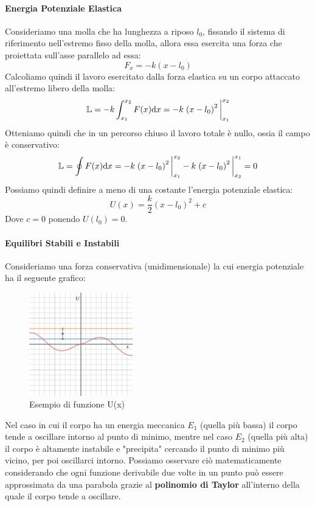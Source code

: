 \documentclass{article}
\begin{document}
\paragraph{Energia Potenziale Elastica}
Consideriamo una molla che ha lunghezza a riposo $l_0$, fissando il sistema di riferimento nell'estremo fisso della molla, allora essa esercita una forza che proiettata sull'asse parallelo ad essa:
\[F_x=-k(x-l_0)\]
Calcoliamo quindi il lavoro esercitato dalla forza elastica su un corpo attaccato all'estremo libero della molla:
\[\mathbb{L}=-k\int_{x_1}^{x_2}F(x)\dd x=-k\eval{\left(x-l_0\right)^2}_{x_1}^{x_2}\]
Otteniamo quindi che in un percorso chiuso il lavoro totale è nullo, ossia il campo è conservativo:
\[\mathbb{L}=\oint F(x)\dd x=-k\eval{\left(x-l_0\right)^2}_{x_1}^{x_2}-k\eval{\left(x-l_0\right)^2}_{x_2}^{x_1}=0\]
Possiamo quindi definire a meno di una costante l'energia potenziale elastica:
\[U(x)=\frac{k}{2}(x-l_0)^2+c\]
Dove $c=0$ ponendo $U(l_0)=0$.

\paragraph{Equilibri Stabili e Instabili}
Consideriamo una forza conservativa (unidimensionale) la cui energia potenziale ha il seguente grafico:
\begin{figure}[H]
    \centering
    \includegraphics[width=0.4\textwidth]{Equilibri.jpg}
    \caption{Esempio di funzione U(x)}
    \label{equilibrienergiapotenziale}
\end{figure}

Nel caso in cui il corpo ha un energia meccanica $E_1$ (quella più bassa) il corpo tende a oscillare intorno al punto di minimo, mentre nel caso $E_2$ (quella più alta) il corpo è altamente instabile e "precipita" cercando il punto di minimo più vicino, per poi oscillarci intorno. Possiamo osservare ciò matematicamente considerando che ogni funzione derivabile due volte in un punto può essere approssimata da una parabola grazie al \textbf{polinomio di Taylor} all'interno della quale il corpo tende a oscillare.
\end{document}
